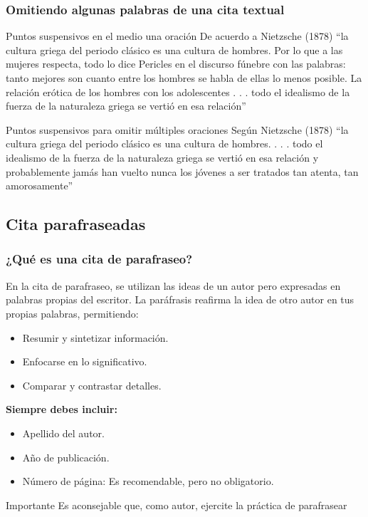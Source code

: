\documentclass[
11pt, %
]{beamer}
\begin{document}
\begin{frame}
	\frametitle{Omitiendo algunas palabras de una cita textual}

	\begin{exampleblock}{Puntos suspensivos en el medio una oración}
		De acuerdo a Nietzsche (1878) ``la cultura griega del periodo clásico es una cultura de hombres. Por lo que a las mujeres respecta, todo lo dice Pericles en el discurso fúnebre con las palabras: tanto mejores son cuanto entre los hombres se habla de ellas lo menos posible. La relación erótica de los hombres con los adolescentes{\color{blue} . . .} todo el idealismo de la fuerza de la naturaleza griega se vertió en esa relación''
	\end{exampleblock}

	\begin{exampleblock}{Puntos suspensivos para omitir múltiples oraciones}
		Según Nietzsche (1878) ``la cultura griega del periodo clásico es una cultura de hombres{\color{red}.} {\color{blue}. . .} todo el idealismo de la fuerza de la naturaleza griega se vertió en esa relación y probablemente jamás han vuelto nunca los jóvenes a ser tratados tan atenta, tan amorosamente''
	\end{exampleblock}

\end{frame}



\subsection{Cita parafraseadas}

\begin{frame}
	\frametitle{¿Qué es una cita de parafraseo?}

	\begin{block}{}
		En la cita de parafraseo, se utilizan las ideas de un autor pero expresadas en palabras propias del escritor. La paráfrasis reafirma la idea de otro autor en tus propias palabras, permitiendo:
	\end{block}

	\begin{itemize}
		\item Resumir y sintetizar información.
		\item Enfocarse en lo significativo.
		\item Comparar y contrastar detalles.
	\end{itemize}

	\textbf{Siempre debes incluir:}
	\begin{itemize}
		\item Apellido del autor.
		\item Año de publicación.
		\item  Número de página: Es recomendable, pero no obligatorio.
	\end{itemize}

	\begin{alertblock}{Importante}
		Es aconsejable que, como autor, ejercite la práctica de parafrasear
	\end{alertblock}

\end{frame}
\end{document}
